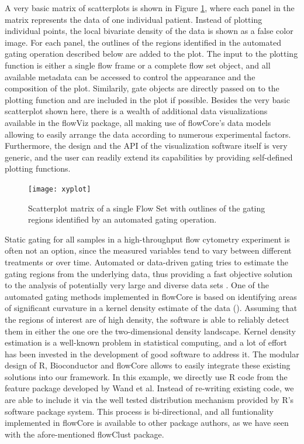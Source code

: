 \documentclass[12pt]{article}
\begin{document}
A very basic matrix of scatterplots is shown in Figure \ref{xyplot},
where each panel in the matrix represents the data of one individual
patient. Instead of plotting individual points, the local bivariate
density of the data is shown as a false color image. For each panel,
the outlines of the regions identified in the automated gating
operation described below are added to the plot. The input to the
plotting function is either a single flow frame or a complete flow set
object, and all available metadata can be accessed to control the
appearance and the composition of the plot. Similarily, gate objects
are directly passed on to the plotting function and are included in
the plot if possible. Besides the very basic scatterplot shown here,
there is a wealth of additional data visualizations available in the
flowViz package\cite{sarkar2008ufv}, all making use of flowCore's data
models allowing to easily arrange the data according to numerous
experimental factors. Furthermore, the design and the API of the
visualization software itself is very generic, and the user can
readily extend its capabilities by providing self-defined plotting
functions.

\begin{figure}[htbp]
\centering
\texttt{[image: xyplot]}
\caption{\label{xyplot}%
Scatterplot matrix of a single Flow Set with outlines of the gating
regions identified by an automated gating operation.}
\end{figure}

Static gating for all samples in a high-throughput flow cytometry
experiment is often not an option, since the measured variables tend
to vary between different treatments or over time. Automated or
data-driven gating tries to estimate the gating regions from the
underlying data, thus providing a fast objective solution to the
analysis of potentially very large and diverse data sets
\cite{lo2008agf}. One of the automated gating methods implemented in
flowCore is based on identifying areas of significant curvature in a
kernel density estimate of the data (\citep{wand2008}). Assuming that
the regions of interest are of high density, the software is able to
reliably detect them in either the one ore the two-dimensional density
landscape. Kernel density estimation is a well-known problem in
statistical computing, and a lot of effort has been invested in the
development of good software to address it. The modular design of R,
Bioconductor and flowCore allows to easily integrate these existing
solutions into our framework. In this example, we directly use R code
from the feature package developed by Wand et al. Instead of
re-writing existing code, we are able to include it via the well
tested distribution mechanism provided by R's software package
system. This process is bi-directional, and all funtionality
implemented in flowCore is available to other package authors, as we
have seen with the afore-mentioned flowClust package.
\end{document}
